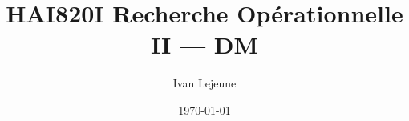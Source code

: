 










\title{\color{astral} \sffamily \bfseries HAI820I Recherche Opérationnelle II --- DM}
\author{Ivan Lejeune}
\date{\today}

\toggletrue{showsolutions} %


    \maketitle
    \tableofcontents

    \newpage
    \setcounter{tdcounter}{0}
    
    \newpage
    
    



